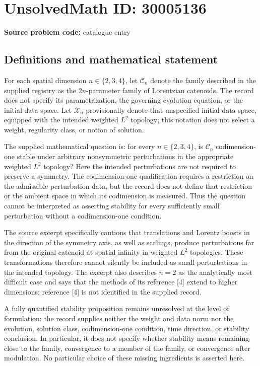 \documentclass[11pt]{article}
\begin{document}
\section*{UnsolvedMath ID: 30005136}
\textbf{Source problem code:} catalogue entry
\subsection{Definitions and mathematical statement}
For each spatial dimension \(n\in\{2,3,4\}\), let \(\mathcal C_n\) denote the family described in the supplied registry as the \(2n\)-parameter family of Lorentzian catenoids. The record does not specify its parametrization, the governing evolution equation, or the initial-data space. Let \(\mathcal X_n\) provisionally denote that unspecified initial-data space, equipped with the intended weighted \(L^2\) topology; this notation does not select a weight, regularity class, or notion of solution.

The supplied mathematical question is: for every \(n\in\{2,3,4\}\), is \(\mathcal C_n\) codimension-one stable under arbitrary nonsymmetric perturbations in the appropriate weighted \(L^2\) topology? Here the intended perturbations are not required to preserve a symmetry. The codimension-one qualification requires a restriction on the admissible perturbation data, but the record does not define that restriction or the ambient space in which its codimension is measured. Thus the question cannot be interpreted as asserting stability for every sufficiently small perturbation without a codimension-one condition.

The source excerpt specifically cautions that translations and Lorentz boosts in the direction of the symmetry axis, as well as scalings, produce perturbations far from the original catenoid at spatial infinity in weighted \(L^2\) topologies. These transformations therefore cannot silently be included as small perturbations in the intended topology. The excerpt also describes \(n=2\) as the analytically most difficult case and says that the methods of its reference [4] extend to higher dimensions; reference [4] is not identified in the supplied record.

A fully quantified stability proposition remains unresolved at the level of formulation: the record supplies neither the weight and data norm nor the evolution, solution class, codimension-one condition, time direction, or stability conclusion. In particular, it does not specify whether stability means remaining close to the family, convergence to a member of the family, or convergence after modulation. No particular choice of these missing ingredients is asserted here.
\end{document}
